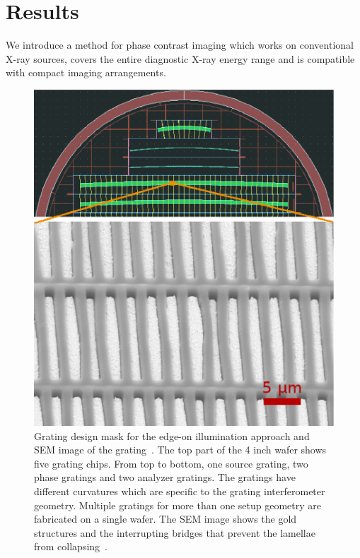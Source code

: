 \section{Results}
We introduce a method for phase contrast imaging which works on
conventional X-ray sources, covers the entire diagnostic X-ray energy range
and is compatible with compact imaging arrangements. 

\begin{figure}[h!]
    \centering
    \includegraphics[width=\textwidth]{gfx/grating_mask.eps}
    \caption[Grating design mask.]{Grating design mask for
        the edge-on illumination approach and \ac{SEM}
        image of the grating~\parencite{Thuering2014b}. The top part of the 4 inch wafer shows
        five grating chips. From top to bottom, one source grating, two
        phase gratings and two analyzer gratings. The
        gratings have different curvatures which are specific to the grating
        interferometer geometry. Multiple gratings for more than one setup
        geometry are fabricated on a single wafer.
        The \ac{SEM} image shows the gold structures and the interrupting bridges
        that prevent the lamellae from collapsing~\parencite{Kenntner2010}.}\label{Fig:grating_mask}
\end{figure}

